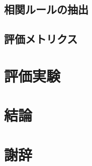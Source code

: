 \documentclass[a4paper]{jsbook}
\begin{document}
\section{相関ルールの抽出}
\section{評価メトリクス}
\chapter{評価実験}
\chapter{結論}
\chapter{謝辞}
\appendix

\backmatter


\end{document}
